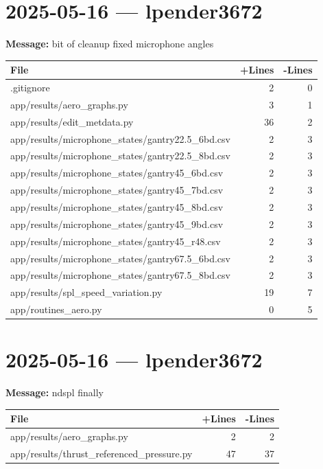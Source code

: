 \documentclass{article}
\begin{document}
\section*{2025-05-16 --- lpender3672}
\textbf{Message:} bit of cleanup fixed microphone angles

\begin{longtable}{|p{10cm}|r|r|}
\hline \textbf{File} & \textbf{+Lines} & \textbf{-Lines} \\
\hline
.gitignore & 2 & 0 \\
\hline
app/results/aero\_graphs.py & 3 & 1 \\
\hline
app/results/edit\_metdata.py & 36 & 2 \\
\hline
app/results/microphone\_states/gantry22.5\_6bd.csv & 2 & 3 \\
\hline
app/results/microphone\_states/gantry22.5\_8bd.csv & 2 & 3 \\
\hline
app/results/microphone\_states/gantry45\_6bd.csv & 2 & 3 \\
\hline
app/results/microphone\_states/gantry45\_7bd.csv & 2 & 3 \\
\hline
app/results/microphone\_states/gantry45\_8bd.csv & 2 & 3 \\
\hline
app/results/microphone\_states/gantry45\_9bd.csv & 2 & 3 \\
\hline
app/results/microphone\_states/gantry45\_r48.csv & 2 & 3 \\
\hline
app/results/microphone\_states/gantry67.5\_6bd.csv & 2 & 3 \\
\hline
app/results/microphone\_states/gantry67.5\_8bd.csv & 2 & 3 \\
\hline
app/results/spl\_speed\_variation.py & 19 & 7 \\
\hline
app/routines\_aero.py & 0 & 5 \\
\hline
\end{longtable}

\section*{2025-05-16 --- lpender3672}
\textbf{Message:} ndspl finally

\begin{longtable}{|p{10cm}|r|r|}
\hline \textbf{File} & \textbf{+Lines} & \textbf{-Lines} \\
\hline
app/results/aero\_graphs.py & 2 & 2 \\
\hline
app/results/thrust\_referenced\_pressure.py & 47 & 37 \\
\hline
\end{longtable}
\end{document}
